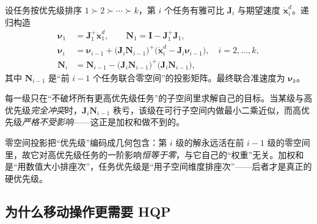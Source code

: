 \begin{theorem}[任务优先级的递归零空间投影]\label{thm:mmk-recursive}
设任务按优先级排序 $1\succ2\succ\cdots\succ k$，第 $i$ 个任务有雅可比 $\mathbf{J}_i$ 与期望速度 $\dot{\mathbf{x}}_i^d$。递归构造
\begin{align}
  \boldsymbol{\nu}_1&=\mathbf{J}_1^{+}\dot{\mathbf{x}}_1^d,\qquad \mathbf{N}_1=\mathbf{I}-\mathbf{J}_1^{+}\mathbf{J}_1, \label{eq:mmk-rec-init}\\
  \boldsymbol{\nu}_i&=\boldsymbol{\nu}_{i-1}+\big(\mathbf{J}_i\mathbf{N}_{i-1}\big)^{+}\big(\dot{\mathbf{x}}_i^d-\mathbf{J}_i\boldsymbol{\nu}_{i-1}\big),\quad i=2,\dots,k, \label{eq:mmk-rec-step}\\
  \mathbf{N}_i&=\mathbf{N}_{i-1}-\big(\mathbf{J}_i\mathbf{N}_{i-1}\big)^{+}\big(\mathbf{J}_i\mathbf{N}_{i-1}\big), \label{eq:mmk-rec-N}
\end{align}
其中 $\mathbf{N}_{i-1}$ 是“前 $i-1$ 个任务联合零空间”的投影矩阵。最终联合准速度为 $\boldsymbol{\nu}_k$。
\end{theorem}

\noindent 每一级只在“不破坏所有更高优先级任务”的子空间里求解自己的目标。当某级与高优先级\emph{完全冲突}时，$\mathbf{J}_i\mathbf{N}_{i-1}$ 秩亏，该级在可行子空间内做最小二乘近似，而高优先级\emph{严格不受影响}——这正是加权和做不到的。

\begin{insight}[优先级 = 子空间包含关系]
零空间投影把“优先级”编码成几何包含：第 $i$ 级的解永远活在前 $i-1$ 级的零空间里，故它对高优先级任务的一阶影响\emph{恒等于零}，与它自己的“权重”无关。加权和是“用数值大小排座次”，任务优先级是“用子空间维度排座次”——后者才是真正的硬优先级。
\end{insight}

\subsection{为什么移动操作更需要 HQP}
\label{sec:mmk-hqp}

